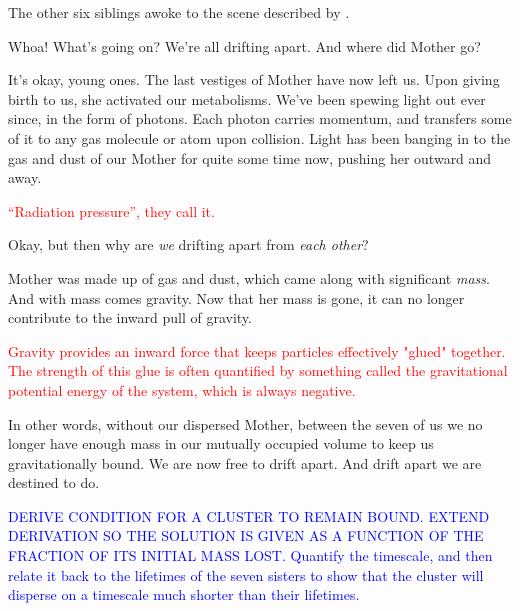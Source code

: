 \documentclass[main.tex]{subfiles}
\begin{document}
\par \nar The other six siblings awoke to the scene described by \rmsterope.  

\par \Electra Whoa!  What's going on?  We're all drifting apart.  And where did Mother go?

\par \Maia It's okay, young ones.  The last vestiges of Mother have now left us.  Upon giving birth to us, she activated our metabolisms.  We've been spewing light out ever since, in the form of photons.  Each photon carries momentum, and transfers some of it to any gas molecule or atom upon collision.  Light has been banging in to the gas and dust of our Mother for quite some time now, pushing her outward and away.

\begin{tcolorbox}[sharp corners, colback=red!30, colframe=red!80!blue, title=Momentum Carried by Light]
\par \textcolor{red} {``Radiation pressure'', they call it.}
\end{tcolorbox}

\par \Electra Okay, but then why are \textit{we} drifting apart from \textit{each other}?

\par \Maia Mother was made up of gas and dust, which came along with significant \textit{mass}.  And with mass comes gravity.  Now that her mass is gone, it can no longer contribute to the inward pull of gravity.

\begin{tcolorbox}[sharp corners, colback=red!30, colframe=red!80!blue, title=Gravitational Potential Energy]
\par \textcolor{red} {Gravity provides an inward force that keeps particles effectively "glued" together.  The strength of this glue is often quantified by something called the gravitational potential energy of the system, which is always negative.}  
\end{tcolorbox}

\par \Maia In other words, without our dispersed Mother, between the seven of us we no longer have enough mass in our mutually occupied volume to keep us gravitationally bound.  We are now free to drift apart.  And drift apart we are destined to do. 

\begin{tcolorbox}[sharp corners, colback=blue!30, colframe=blue!80!blue, title=Gravitational Binding Energy]
\par \textcolor{blue} {DERIVE CONDITION FOR A CLUSTER TO REMAIN BOUND.  EXTEND DERIVATION SO THE SOLUTION IS GIVEN AS A FUNCTION OF THE FRACTION OF ITS INITIAL MASS LOST. Quantify the timescale, and then relate it back to the lifetimes of the seven sisters to show that the cluster will disperse on a timescale much shorter than their lifetimes.}   
\end{tcolorbox}
\end{document}
